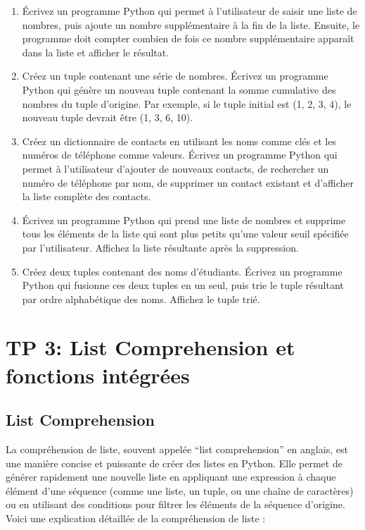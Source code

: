 \documentclass[11pt]{article}
\begin{document}
\begin{enumerate}
\def\labelenumi{\arabic{enumi}.}
\setcounter{enumi}{3}
\item
  Écrivez un programme Python qui permet à l'utilisateur de saisir une
  liste de nombres, puis ajoute un nombre supplémentaire à la fin de la
  liste. Ensuite, le programme doit compter combien de fois ce nombre
  supplémentaire apparaît dans la liste et afficher le résultat.
\item
  Créez un tuple contenant une série de nombres. Écrivez un programme
  Python qui génère un nouveau tuple contenant la somme cumulative des
  nombres du tuple d'origine. Par exemple, si le tuple initial est (1,
  2, 3, 4), le nouveau tuple devrait être (1, 3, 6, 10).
\item
  Créez un dictionnaire de contacts en utilisant les noms comme clés et
  les numéros de téléphone comme valeurs. Écrivez un programme Python
  qui permet à l'utilisateur d'ajouter de nouveaux contacts, de
  rechercher un numéro de téléphone par nom, de supprimer un contact
  existant et d'afficher la liste complète des contacts.
\item
  Écrivez un programme Python qui prend une liste de nombres et supprime
  tous les éléments de la liste qui sont plus petits qu'une valeur seuil
  spécifiée par l'utilisateur. Affichez la liste résultante après la
  suppression.
\item
  Créez deux tuples contenant des noms d'étudiants. Écrivez un programme
  Python qui fusionne ces deux tuples en un seul, puis trie le tuple
  résultant par ordre alphabétique des noms. Affichez le tuple trié.
\end{enumerate}

    

    \hypertarget{tp-3-list-comprehension-et-fonctions-intuxe9gruxe9es}{%
\section{TP 3: List Comprehension et fonctions
intégrées}\label{tp-3-list-comprehension-et-fonctions-intuxe9gruxe9es}}

\hypertarget{list-comprehension}{%
\subsection{List Comprehension}\label{list-comprehension}}

La compréhension de liste, souvent appelée ``list comprehension'' en
anglais, est une manière concise et puissante de créer des listes en
Python. Elle permet de générer rapidement une nouvelle liste en
appliquant une expression à chaque élément d'une séquence (comme une
liste, un tuple, ou une chaîne de caractères) ou en utilisant des
conditions pour filtrer les éléments de la séquence d'origine. Voici une
explication détaillée de la compréhension de liste :
\end{document}
